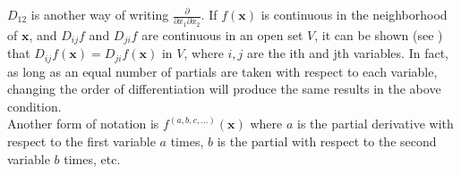 \documentclass[12pt]{article}
\begin{document}
$D_{12}$ is another way of writing $\frac{\partial}{\partial x_1 \partial x_2}$. If $f(\mathbf{x})$ is continuous in the neighborhood of $\mathbf{x}$,
and $D_{ij}f$ and $D_{ji}f$ are continuous in an open set $V$,  it can be shown 
(see ) that $D_{ij}f(\mathbf{x}) = D_{ji}f(\mathbf{x})$ in $V$, where $i,j$ are the ith and jth variables. In fact, as long as an equal number of partials are taken with respect to each variable, changing the order of differentiation will produce the same results in the above condition.\\
Another form of notation is $f^{(a,b,c,...)}(\mathbf{x})$ where $a$ is the partial derivative with respect to the first variable $a$ times, $b$ is the partial with respect to the second variable $b$ times, etc.
\end{document}
